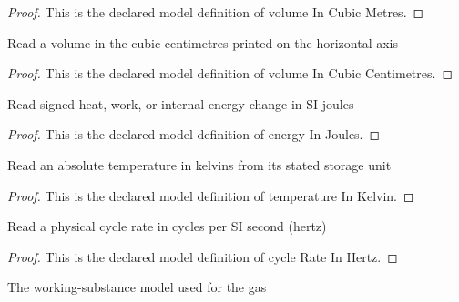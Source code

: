 \begin{proof}
  This is the declared model definition of volume In Cubic Metres.
\end{proof}
\begin{definition}
  \label{def:physics:phyx-mini-0427:phyxminiproblems-problemphyxmini0427-volumeincubiccentimetres}
  Read a volume in the cubic centimetres printed on the horizontal axis
\end{definition}
\begin{proof}
  This is the declared model definition of volume In Cubic Centimetres.
\end{proof}
\begin{definition}
  \label{def:physics:phyx-mini-0427:phyxminiproblems-problemphyxmini0427-energyinjoules}
  Read signed heat, work, or internal-energy change in SI joules
\end{definition}
\begin{proof}
  This is the declared model definition of energy In Joules.
\end{proof}
\begin{definition}
  \label{def:physics:phyx-mini-0427:phyxminiproblems-problemphyxmini0427-temperatureinkelvin}
  Read an absolute temperature in kelvins from its stated storage unit
\end{definition}
\begin{proof}
  This is the declared model definition of temperature In Kelvin.
\end{proof}
\begin{definition}
  \label{def:physics:phyx-mini-0427:phyxminiproblems-problemphyxmini0427-cyclerateinhertz}
  Read a physical cycle rate in cycles per SI second (hertz)
\end{definition}
\begin{proof}
  This is the declared model definition of cycle Rate In Hertz.
\end{proof}
\begin{definition}
  \label{def:physics:phyx-mini-0427:phyxminiproblems-problemphyxmini0427-gasmodel}
  The working-substance model used for the gas
\end{definition}
